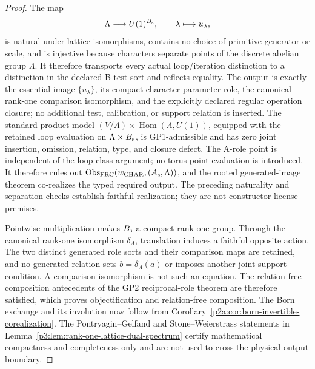\documentclass[12pt,a4paper]{article}
\begin{document}
\begin{proof}
The map
\[
 \Lambda\longrightarrow U(1)^{B_{\rm s}},
 \qquad \lambda\longmapsto u_\lambda,
\]
is natural under lattice isomorphisms, contains no choice of primitive
generator or scale, and is injective because characters separate points of the
discrete abelian group \(\Lambda\).  It therefore transports every actual
loop/iteration distinction to a distinction in the declared B-test sort and
reflects equality.  The output is exactly the essential image
\(\{u_\lambda\}\), its compact character parameter role, the canonical
rank-one comparison isomorphism, and the explicitly declared regular
operation closure; no additional test, calibration, or support relation is
inserted.  The standard product model
\((V/\Lambda)\times\operatorname{Hom}(\Lambda,U(1))\), equipped with the
retained loop evaluation on \(\Lambda\times B_{\rm s}\), is
GP1-admissible and has zero joint insertion, omission, relation, type, and
closure defect. The A-role point is independent of the loop-class argument;
no torus-point evaluation is introduced.  It therefore rules out
\(\operatorname{Obs}_{\rm FRC}(w_{\rm CHAR},(A_{\rm s},\Lambda))\), and the
rooted generated-image theorem co-realizes the typed required output.  The
preceding naturality and separation checks establish faithful realization;
they are not constructor-license premises.

Pointwise multiplication makes \(B_{\rm s}\) a compact rank-one group.
Through the canonical rank-one isomorphism \(\delta_\Lambda\), translation
induces a faithful opposite action.  The two distinct generated role sorts and their comparison maps are retained,
and no generated relation sets \(b=\delta_\Lambda(a)\) or imposes another
joint-support condition. A comparison isomorphism is not such an equation.
The relation-free-composition antecedents of the GP2 reciprocal-role theorem
are therefore satisfied,
which proves objectification and relation-free composition.  The
Born exchange and its involution now follow from
Corollary~\ref{p2a:cor:born-invertible-corealization}.  The
Pontryagin--Gelfand and Stone--Weierstrass statements in
Lemma~\ref{p3:lem:rank-one-lattice-dual-spectrum} certify mathematical
compactness and completeness only and are not used to cross the physical
output boundary.
\end{proof}
\end{document}
